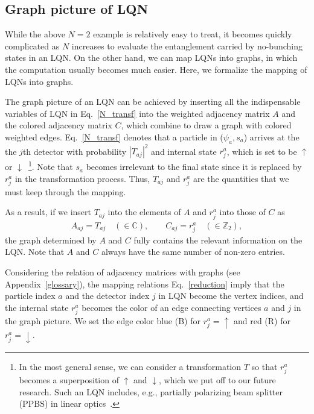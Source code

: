 \documentclass[a4paper,twocolumn,8pt,accepted=2021-12-15]{quantumarticle}
\def\p{\psi}
\begin{document}
	
	\subsection{Graph picture of LQN}\label{LQNtoG}
	
	While the above $N=2$ example is relatively easy to treat, it becomes quickly complicated as $N$ increases to evaluate the entanglement carried by no-bunching states in an LQN. On the other hand, we can map LQNs into graphs, in which the computation usually becomes much easier. Here, we formalize  the mapping of LQNs into graphs.
	
	The graph picture of an LQN can be achieved by inserting all the indispensable variables of LQN in Eq.~\eqref{N_transf} into the weighted adjacency matrix $A$ and the colored adjacency matrix $C$, which combine to draw a graph with colored weighted edges.
	Eq.~\eqref{N_transf} denotes that a particle in ($\p_a,s_a$) arrives at the the $j$th detector with probability $|T_{aj}|^2$ and  internal state $r^a_j$, which is set to be $\uparrow$ or $\downarrow$~\footnote{In the most general sense, we can consider a transformation $T$ so that $r_j^a$ becomes a superposition of $\uparrow$ and $\downarrow$, which we put off to our future research. Such an LQN includes, e.g., partially polarizing beam splitter (PPBS) in linear optics~\cite{kim2012protecting,langford2005demonstration,kiesel2005linear,okamoto2005demonstration}.}. Note that $s_a$ becomes irrelevant to the final state since it is replaced by $r^a_j$ in the transformation process. Thus, $T_{aj}$ and $r^a_j$ are the quantities that we must keep through the mapping. 
	
	As a result, if we  insert $T_{aj}$ into the elements of $A$ and $r^a_j$ into those of $C$ as
	\begin{align}\label{reduction}
		A_{aj} = T_{aj}\quad (\in \mathbb{C}), \qquad 
		C_{aj} = r^a_j \quad (\in \mathbb{Z}_2), 
	\end{align} the graph determined by $A$ and $C$ fully contains the relevant information on the LQN.   
	Note that $A$ and $C$ always have the same number of non-zero entries.
	
	
	Considering the relation of adjacency matrices with graphs (see Appendix~\ref{glossary}), the mapping relations Eq.~\eqref{reduction} imply that the particle index $a$ and the detector index $j$ in LQN become the vertex indices, and the internal state $r^a_j$ becomes the color of an edge connecting vertices $a$ and $j$ in the graph picture. We set the edge color blue (B) for $r^a_j=\uparrow$ and red (R) for $r^a_j=\downarrow$. 
	
\end{document}

